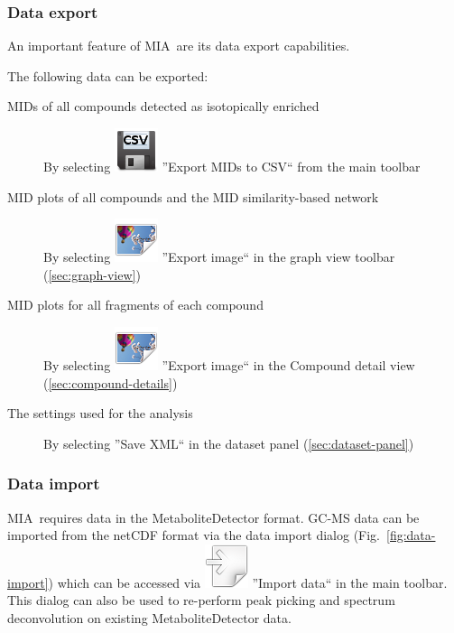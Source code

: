 \documentclass[a4paper,12pt]{scrartcl}
\newcommand*\app{\textsc{MIA}}
\begin{document}
\subsubsection{Data export}

\label{sec:data-export}

An important feature of \app\ are its data export capabilities.

The following data can be exported:
\begin{description}
 \item[MIDs of all compounds detected as isotopically enriched]
 By selecting \includegraphics{../gui/icons/document-save-csv.png} ''Export MIDs to CSV`` from the main toolbar

 \item[MID plots of all compounds and the MID similarity-based network]
  By selecting \includegraphics{gfx/ico_export-image.png} ''Export image`` in the graph view toolbar (\ref{sec:graph-view})

 \item[MID plots for all fragments of each compound]
  By selecting \includegraphics{gfx/ico_export-image.png} ''Export image`` in the Compound detail view (\ref{sec:compound-details})

 \item[The settings used for the analysis]
  By selecting ''Save XML`` in the dataset panel (\ref{sec:dataset-panel})

\end{description}


\subsubsection{Data import}

\label{sec:data-import}

\app\ requires data in the MetaboliteDetector \citep{Hiller2009} format. GC-MS data can be imported from the netCDF format via the data import dialog (Fig.~\ref{fig:data-import}) which can be accessed via \includegraphics{../gui/icons/document-import.png} ''Import data`` in the main toolbar. This dialog can also be used to re-perform peak picking and spectrum deconvolution on existing MetaboliteDetector data.
\end{document}

